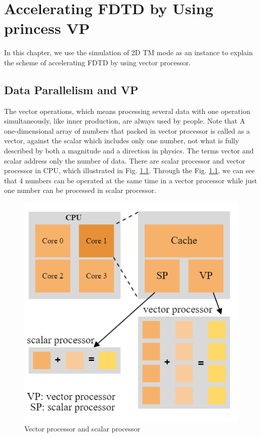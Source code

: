 
\chapter{Accelerating FDTD by Using princess VP}

In this chapter, we use the simulation of 2D TM mode as an instance to explain the scheme of accelerating FDTD by using vector processor.

\section{Data Parallelism and VP}

The vector operations, which means processing several data with one operation simultaneously, like inner production, are always used by people. Note that A one-dimensional array of numbers that packed in vector processor is called as a vector, against the scalar which includes only one number, not what is fully described by both a magnitude and a direction in physics. The terms vector and scalar address only the number of data. There are scalar processor and vector processor in CPU, which illustrated in Fig. \ref{ch3 fig:vectorprocessor}. Through the Fig. \ref{ch3 fig:vectorprocessor}, we can see that 4 numbers can be operated at the same time in a vector processor while just one number can be processed in scalar processor. 

\begin{figure}[hbtp]
\centering
\includegraphics[width=0.7\linewidth]{pics/vectorprocessor}
\caption{Vector processor and scalar processor}
\label{ch3 fig:vectorprocessor}
\end{figure}

